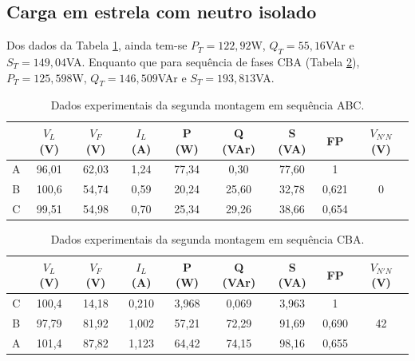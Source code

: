 \documentclass[a4paper,12pt,oneside,openany,table,xcdraw]{article}
\begin{document}
\subsection{Carga em estrela com neutro isolado} \label{m2:dados}
Dos dados da Tabela \ref{m2:dados:abc}, ainda tem-se $P_T = 122,92$W, $Q_T = 55,16$VAr e $S_T = 149,04$VA. Enquanto que para sequência de fases CBA (Tabela \ref{m2:dados:cba}), $P_T = 125,598$W, $Q_T = 146,509$VAr e $S_T = 193,813$VA.

\begin{table}[H]
\centering \small {}
\caption{Dados experimentais da segunda montagem em sequência ABC.}
\label{m2:dados:abc}
\begin{tabular}{c|c|c|c|c|c|c|c|c|}
\cline{2-9}
                        & $V_L$ (V) & $V_F$ (V) & $I_L$ (A) & P (W) & Q (VAr) & S (VA) & FP    & $V_{N'N}$ (V)      \\ \hline
\multicolumn{1}{|c|}{A} & 96,01     & 62,03     & 1,24      & 77,34 & 0,30    & 77,60  & 1     & \multirow{3}{*}{0} \\ \cline{1-8}
\multicolumn{1}{|c|}{B} & 100,6     & 54,74     & 0,59      & 20,24 & 25,60   & 32,78  & 0,621 &                    \\ \cline{1-8}
\multicolumn{1}{|c|}{C} & 99,51     & 54,98     & 0,70      & 25,34 & 29,26   & 38,66  & 0,654 &                    \\ \hline
\end{tabular}
\end{table}

\begin{table}[H]
\caption{Dados experimentais da segunda montagem em sequência CBA.}
\label{m2:dados:cba}
\centering \small {}
\begin{tabular}{c|c|c|c|c|c|c|c|c|}
\cline{2-9}
                        & $V_L$ (V) & $V_F$ (V) & $I_L$ (A) & P (W) & Q (VAr) & S (VA) & FP    & $V_{N'N}$ (V)      \\ \hline
\multicolumn{1}{|c|}{C} & 100,4     & 14,18     & 0,210     & 3,968 & 0,069   & 3,963  & 1     & \multirow{3}{*}{42} \\ \cline{1-8}
\multicolumn{1}{|c|}{B} & 97,79     & 81,92     & 1,002     & 57,21 & 72,29   & 91,69  & 0,690 &                     \\ \cline{1-8}
\multicolumn{1}{|c|}{A} & 101,4     & 87,82     & 1,123     & 64,42 & 74,15   & 98,16  & 0,655 &                     \\ \hline
\end{tabular}
\end{table}
\end{document}
